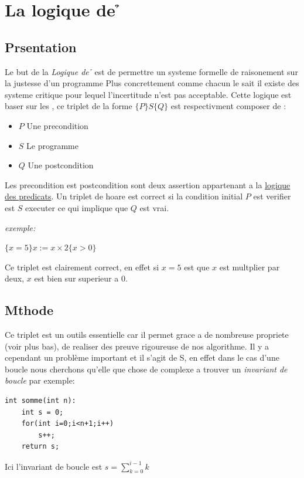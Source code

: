 \documentclass[French,Hoar.tex]{subfiles}
\begin{document}
  \section{La logique de \h}
  \subsection{Pr\e sentation}
    Le but de la \emph{Logique de \h} est de permettre un systeme formelle de raisonement 
    sur la justesse d'un programme \cite{Hoar:1}
    Plus concrettement comme chacun le sait il existe des systeme critique pour lequel l'incertitude
    n'est pas acceptable.
    Cette logique est baser sur les \textbf{\color{nred}{ triplet de \h}},
    ce triplet de la forme $\{P\} S \{Q\}$ est respectivment composer de :
    \begin{itemize}
      \item[\ding{227}] $P$ Une precondition
      \item[\ding{227}] $S$ Le programme
      \item[\ding{227}] $Q$ Une postcondition
    \end{itemize}
    Les precondition est postcondition sont deux assertion appartenant a la \href{http://zanotti.univ-tln.fr/MD/MD-Ensembles.html#pr%C3%A9dicats}{logique des predicats}.
    Un triplet de hoare est correct si la condition initial $P$ est verifier est $S$ executer ce qui implique que
    $Q$ est vrai.

    \emph{exemple:}
    \begin{center}
     $\{x = 5\} x := x\times 2 \{x > 0\}$ 
    \end{center}
    Ce triplet est clairement correct, en effet si $x=5$ est que $x$ est multplier par deux, $x$ est bien sur 
    superieur a 0.


  \subsection{M\e thode}
  Ce triplet est un outils essentielle car il permet grace a de nombreuse propriete (voir plus bas), de realiser des preuve rigoureuse de nos 
  algorithme. Il y a cependant un problème important et il s'agit de S, en effet dans le cas d'une boucle nous cherchons qu'elle que chose de complexe 
  a trouver un \emph{invariant de boucle} par exemple:
  \begin{lstlisting}[style=C]
  int somme(int n):
    int s = 0;
    for(int i=0;i<n+1;i++)
        s++;
    return s;
\end{lstlisting}
Ici l'invariant de boucle est $s=\sum_{k=0}^{i-1} k$
\end{document}
